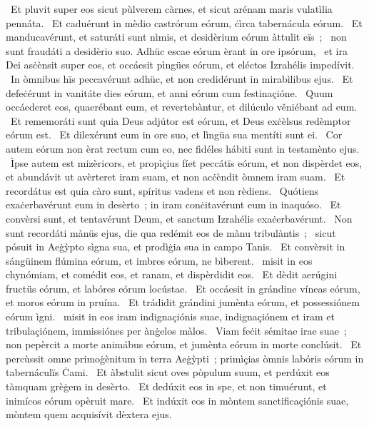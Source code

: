 {~Et pluvit super eos sicut pùlverem càrnes, et sicut arénam maris vulatìlia pennáta. 
~Et caduérunt in mèdio castrórum eórum, ċìrca tabernácula eórum. 
~Et manducavérunt, et saturáti sunt nìmis, et desidèrium eórum àttulit eïs~; 
~non sunt fraudáti a desidèrio suo. Adhüc escae eórum èrant in ore ipsórum, 
~et ira Dei asċènsit super eos, et occáesit pìngües eórum, et eléctos Izrahélis impedívit. 
~In òmnibus hïs peccavérunt adhüc, et non credidérunt in mirabìlibus ejus. 
~Et defeċérunt in vanitáte dies eórum, et anni eórum cum festinaçióne. 
~Quum occáederet eos, quaerébant eum, et revertebàntur, et dilúculo věniébant ad eum. 
~Et rememoráti sunt quia Deus adjútor est eórum, et Deus exċèlsus redèmptor eórum est. 
~Et dilexérunt eum in ore suo, et lìngüa sua mentíti sunt ei. 
~Cor autem eórum non èrat rectum cum eo, nec fidéles hábiti sunt in testamènto ejus. 
~Ìpse autem est mizèricors, et propìçius fíet peccátïs eórum, et non dispèrdet eos, et abundávit ut avèrteret iram suam, et non acċèndit òmnem iram suam. 
~Et recordátus est quia càro sunt, spíritus vadens et non rèdiens. 
~Quótiens exaċerbavérunt eum in desèrto~; in iram conċitavérunt eum in inaquóso. 
~Et convèrsi sunt, et tentavérunt Deum, et sanctum Izrahélis exaċerbavérunt. 
~Non sunt recordáti mànüs ejus, die qua redémit eos de mànu tribulàntis~; 
~sicut pósuit in Aeġỳpto sìgna sua, et prodìġia sua in campo Tanis. 
~Et convèrsit in sángüinem flúmina eórum, et imbres eórum, ne bìberent. 
~misit in eos chynómiam, et comédit eos, et ranam, et dispèrdidit eos. 
~Et dèdit aerúgini fructüs eórum, et labóres eórum locústae. 
~Et occáesit in grándine víneas eórum, et moros eórum in pruína. 
~Et trádidit grándini jumènta eórum, et possessiónem eórum ìgni. 
~misit in eos iram indignaçiónis suae, indignaçiónem et iram et tribulaçiónem, immissiónes per ànġelos màlos. 
~Viam feċit sémitae irae suae~; non pepèrcit a morte animábus eórum, et jumènta eórum in morte conclúsit. 
~Et percùssit omne primoġènitum in terra Aeġỳpti~; primìçias òmnis labóris eórum in tabernáculïs Ċami. 
~Et àbstulit sicut oves pòpulum suum, et perdúxit eos tàmquam grèġem in desèrto. 
~Et dedúxit eos in spe, et non timuérunt, et inimícos eórum opèruit mare. 
~Et indúxit eos in mòntem sanctificaçiónis suae, mòntem quem acquisívit dèxtera ejus. 
}
